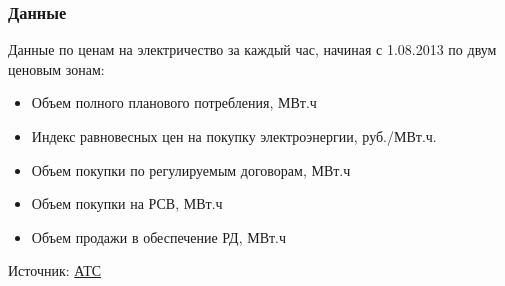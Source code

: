 \documentclass[c, dvipsnames]{beamer}  %
\begin{document}
\begin{frame}[shrink=5]
\frametitle{Данные} 


Данные по ценам на электричество за каждый час, начиная с 1.08.2013 по двум ценовым зонам: 

\begin{itemize}
	\item Объем полного планового потребления, МВт.ч
	\item Индекс равновесных цен на покупку электроэнергии, руб./МВт.ч.
	\item Объем покупки по регулируемым договорам, МВт.ч
	\item  Объем покупки на РСВ, МВт.ч	
	\item Объем продажи в обеспечение РД, МВт.ч	
	
\end{itemize}

Источник: \href{https://www.atsenergo.ru/results/rsv}{АТС}




%
%
%
%
%


\end{frame}
\end{document}
